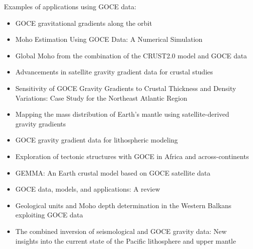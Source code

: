 Examples of applications using GOCE data:
\begin{itemize}
\item GOCE gravitational gradients along the orbit \cite{boff11}
\item Moho Estimation Using GOCE Data: A Numerical Simulation \cite{resa12}
\item Global Moho from the combination of the CRUST2.0 model and GOCE data \cite{ress13}
\item Advancements in satellite gravity gradient data for crustal studies \cite{ebbf13}
\item Sensitivity of GOCE Gravity Gradients to Crustal Thickness and Density Variations: Case Study
for the Northeast Atlantic Region \cite{ebbf14}
\item Mapping the mass distribution of Earth’s mantle
using satellite-derived gravity gradients \cite{papg14}
\item GOCE gravity gradient data for lithospheric modeling \cite{boem15}
\item Exploration of tectonic structures with GOCE in Africa and across-continents \cite{brai15}
\item GEMMA: An Earth crustal model based on GOCE satellite data \cite{resa15}
\item GOCE data, models, and applications: A review \cite{vapb15a}
\item Geological units and Moho depth determination in the Western Balkans exploiting GOCE data \cite{samp15}
\item The combined inversion of seismological and GOCE gravity data: New
insights into the current state of the Pacific lithosphere and upper mantle \cite{togr17}
\end{itemize}

